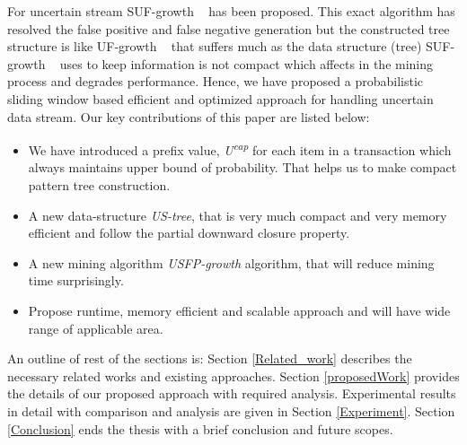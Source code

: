 \documentclass[conference]{IEEEtran}
\begin{document}
For uncertain stream SUF-growth ~\cite{DBLP:conf/icde/LeungH09} has been proposed. This exact algorithm has resolved the false positive and false negative generation but the constructed tree structure is like UF-growth ~\cite{DBLP:conf/kdd/GadeWK04} that suffers much as the data structure (tree) SUF-growth ~\cite{DBLP:conf/icde/LeungH09} uses to keep information is not compact which affects in the mining process and degrades performance. Hence, we have proposed a probabilistic sliding window based efficient and optimized approach for handling uncertain data stream.
Our key contributions of this paper are listed below:
\begin{itemize}
  \item We have introduced a prefix value, \emph{U\textsuperscript{cap}} for each item in a transaction which always maintains upper bound of probability. That helps us to make compact pattern tree construction.
  \item A new data-structure \emph{US-tree}, that is very much compact and very memory efficient and follow the partial downward closure property.
  \item A new mining algorithm \emph{USFP-growth} algorithm, that will reduce mining time surprisingly.
  \item Propose runtime, memory efficient and scalable approach and will have wide range of applicable area.
  \end{itemize}
  
An outline of rest of the sections is: Section \ref{Related_work} describes the necessary related works and existing approaches. Section \ref{proposedWork} provides the details of our proposed approach with required analysis. Experimental results in detail with comparison and analysis are given in Section \ref{Experiment}. Section \ref{Conclusion} ends the thesis with a brief conclusion and future scopes.
\end{document}
